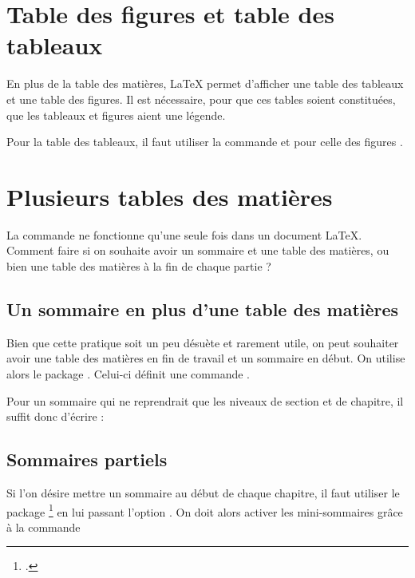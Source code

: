 \section{Table des figures et table des tableaux}\label{tablefigure}

En plus de la table des matières, \LaTeX{} permet d'afficher une table des tableaux et une table des figures. Il est nécessaire, pour que ces tables soient constituées, que les tableaux et figures aient une légende.

Pour la table des tableaux, il faut utiliser la commande  et pour celle des figures  .



\section{Plusieurs tables des matières}

La commande  ne fonctionne qu'une seule fois dans un document \LaTeX{}. Comment faire si on souhaite avoir un sommaire et une table des matières, ou bien une table des matières à la fin de chaque  partie ?

\subsection{Un sommaire en plus d'une table des matières}

Bien que cette pratique soit un peu désuète et rarement utile, on peut souhaiter  avoir une table des matières en fin de travail et un sommaire en début.
On utilise alors le package . Celui-ci définit une commande 
.

Pour un sommaire qui ne reprendrait que les niveaux de section et de chapitre, il suffit donc d'écrire :

\begin{latexcode}
\end{latexcode}




\subsection{Sommaires partiels}

Si l'on désire mettre un sommaire au début de chaque chapitre, il faut utiliser le package \footcite{minitoc} en lui passant l'option . On doit alors activer les mini-sommaires grâce à la commande 

